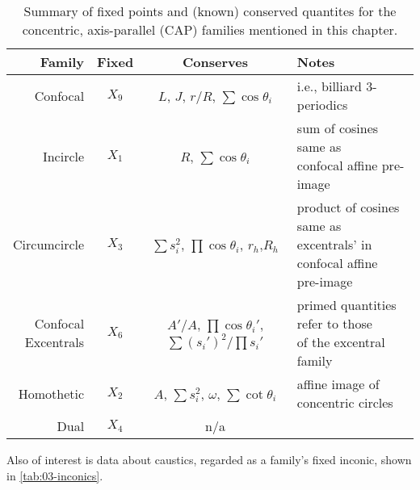\begin{table}
\centering
\begin{tabular}{|r|c|c|l|}
\hline
Family & Fixed & Conserves & Notes \\
\hline
Confocal & $X_9$ & $L$, $J$, $r/R$, $\sum\cos\theta_i$ & i.e., billiard 3-periodics \\
\hline
Incircle & $X_1$ & $R$, $\sum\cos\theta_i$ & \makecell[lc]{sum of cosines same as\\confocal affine pre-image} \\
\hline
Circumcircle & $X_3$ & \makecell[cc]{$\sum{s_i^2}$, $\prod\cos\theta_i$,\\$r_h$,$R_h$} & \makecell[lc]{product of cosines same as\\excentrals' in confocal affine\\pre-image} \\
\hline
\makecell[rc]{Confocal\\Excentrals} & $X_6$ & \makecell[cc]{$A'/A$, $\prod\cos\theta_i'$,\\$\sum{(s_i')^2}/\prod{s_i'}$} & \makecell[lc]{primed quantities refer to those\\of the excentral family}  \\
\hline
Homothetic & $X_2$ & $A$, $\sum{s_i^2}$, $\omega$, $\sum\cot\theta_i$ & affine image of concentric circles  \\
\hline
Dual & $X_4$ & n/a &  \\
\hline
\end{tabular}
\caption{Summary of fixed points and (known) conserved quantites for the concentric, axis-parallel (CAP) families mentioned in this chapter.}
\label{tab:n3-conc-families}
\end{table}

Also of interest is data about caustics, regarded as a family's fixed inconic, shown in \cref{tab:03-inconics}.

